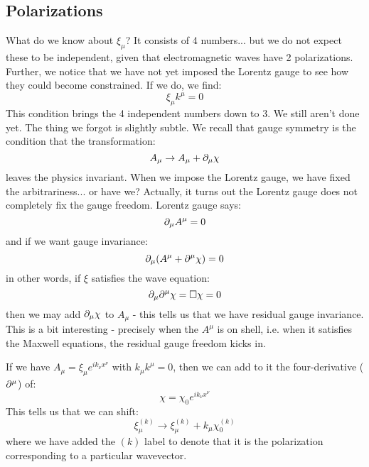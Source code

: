 \subsection{Polarizations}
What do we know about $\xi_\mu$? It consists of 4 numbers... but we do not expect these to be independent, given that electromagnetic waves have 2 polarizations. Further, we notice that we have not yet imposed the Lorentz gauge to see how they could become constrained. If we do, we find:
\begin{equation}
    \xi_\mu k^\mu = 0
\end{equation}
This condition brings the 4 independent numbers down to 3. We still aren't done yet. The thing we forgot is slightly subtle. We recall that gauge symmetry is the condition that the transformation:
\begin{equation}
    A_\mu \to A_\mu + \partial_\mu \chi
\end{equation}
leaves the physics invariant. When we impose the Lorentz gauge, we have fixed the arbitrariness... or have we? Actually, it turns out the Lorentz gauge does not completely fix the gauge freedom. Lorentz gauge says:
\begin{equation}
    \partial_\mu A^\mu = 0
\end{equation}
and if we want gauge invariance:
\begin{equation}
    \partial_\mu (A^\mu + \partial^\mu \chi) = 0
\end{equation}
in other words, if $\xi$ satisfies the wave equation:
\begin{equation}
    \partial_\mu \partial^\mu \chi = \square \chi = 0
\end{equation}
then we may add $\partial_\mu \chi$ to $A_\mu$ - this tells us that we have residual gauge invariance. This is a bit interesting - precisely when the $A^\mu$ is on shell, i.e. when it satisfies the Maxwell equations, the residual gauge freedom kicks in.

If we have $A_\mu = \xi_\mu e^{ik_\nu x^\nu}$ with $k_\mu k^\mu = 0$, then we can add to it the four-derivative ($\partial^\mu$) of:
\begin{equation}
    \chi = \chi_0 e^{ik_\nu x^\nu}
\end{equation}
This tells us that we can shift:
\begin{equation}
    \xi_\mu^{(k)} \to \xi_\mu^{(k)} + k_\mu \chi_0^{(k)}
\end{equation}
where we have added the $(k)$ label to denote that it is the polarization corresponding to a particular wavevector.


